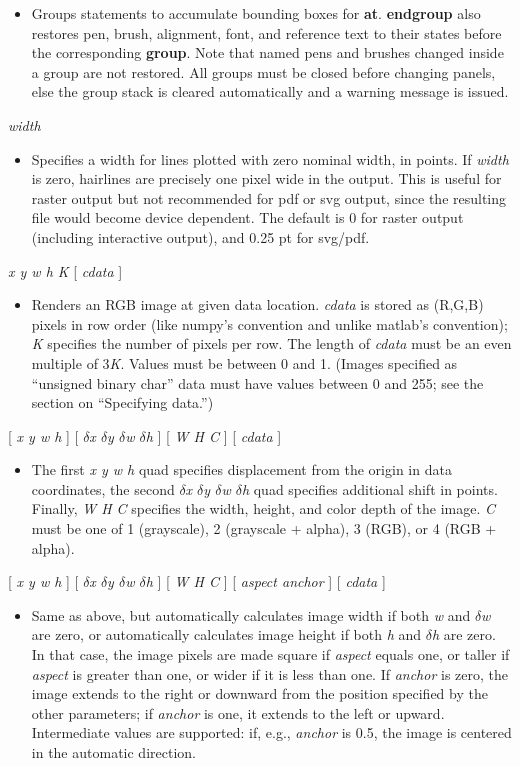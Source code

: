\documentclass[11pt]{article}
\def\cmd#1#2{\noindent {\bf #1} #2\par}
\def\expl#1{\kern-8pt\begin{itemize}\item[]#1\end{itemize}}
\def\cref#1{{\bf #1}}
\begin{document}
\cmd{group}{}
\cmd{endgroup}{}
\expl{Groups statements to accumulate bounding boxes for
  \cref{at}. \cref{endgroup} also restores pen, brush, alignment,
  font, and
  reference text to their states before the corresponding
  \cref{group}. Note that named pens and brushes changed inside a
  group are not restored. All groups must be closed before changing
  panels, else the group stack is cleared automatically and a warning
  message is issued. }

\cmd{hairline}{\emph{width}} \expl{Specifies a width for lines plotted
  with zero nominal width, in points. If \emph{width} is zero,
  hairlines are precisely one pixel wide in the output. This is
  useful for raster output but not recommended for pdf or svg output,
  since the resulting file would become device dependent. The default
  is 0 for raster output (including interactive output), and 0.25 pt
  for svg/pdf.}

\cmd{image}{\emph{x y w h K} [ \emph{cdata} ]} \expl{Renders an RGB
  image at given data location. \emph{cdata} is stored as (R,G,B)
  pixels in row order (like numpy's convention and unlike matlab's
  convention); \emph{K} specifies the number of pixels per row. The
  length of \emph{cdata} must be an even multiple of 3\emph{K}. Values
  must be between 0 and 1. (Images specified as ``unsigned  binary
  char'' data must have
  values between 0 and 255; see the section on ``Specifying data.'')}

\cmd{image}{[ \emph{x y w h} ]
  [ \emph{$\delta$x $\delta$y $\delta$w $\delta$h} ] [ \emph{W H C} ] [
    \emph{cdata} ]}
 \expl{The first \emph{x y w h} quad specifies displacement from the origin
in data coordinates, the second  \emph{$\delta$x $\delta$y $\delta$w
  $\delta$h} quad specifies additional shift in points. Finally,
\emph{W H C} specifies the width, height, and color depth of the
image. \emph{C} must be one of 1 (grayscale), 2 (grayscale + alpha), 3
(RGB), or 4 (RGB + alpha).}

\cmd{image}{[ \emph{x y w h} ] [ \emph{$\delta$x $\delta$y $\delta$w
      $\delta$h} ] [ \emph{W H C} ] [ \emph{aspect anchor} ] [
    \emph{cdata} ]} \expl{Same as above, but automatically calculates
  image width if both \emph{w} and \emph{$\delta$w} are zero, or
  automatically calculates image height if both \emph{h} and
  \emph{$\delta$h} are zero. In that case, the image pixels are made
  square if \emph{aspect} equals one, or taller if \emph{aspect} is greater than one, or wider if it is less than one. If \emph{anchor} is zero, the image extends to the right or downward from the position specified by the other parameters; if \emph{anchor} is one, it extends to the left or upward. Intermediate values are supported: if, e.g., \emph{anchor} is 0.5, the image is centered in the automatic direction.}
 
\end{document}
